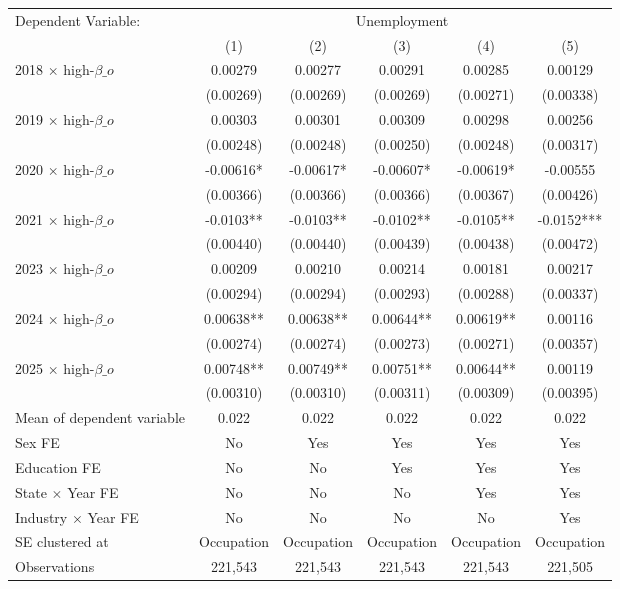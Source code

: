 \def\sym#1{\ifmmode^{#1}\else\(^{#1}\)\fi}
\begin{tabular}{l*{5}{c}}
\toprule
Dependent Variable: & \multicolumn{5}{c}{Unemployment} \\
\cmidrule(lr){2-6}
 & (1) & (2) & (3) & (4) & (5) \\
\midrule
2018 $\times$ high-$\beta\_o$&     0.00279   &     0.00277   &     0.00291   &     0.00285   &     0.00129   \\
            &   (0.00269)   &   (0.00269)   &   (0.00269)   &   (0.00271)   &   (0.00338)   \\
2019 $\times$ high-$\beta\_o$&     0.00303   &     0.00301   &     0.00309   &     0.00298   &     0.00256   \\
            &   (0.00248)   &   (0.00248)   &   (0.00250)   &   (0.00248)   &   (0.00317)   \\
2020 $\times$ high-$\beta\_o$&    -0.00616*  &    -0.00617*  &    -0.00607*  &    -0.00619*  &    -0.00555   \\
            &   (0.00366)   &   (0.00366)   &   (0.00366)   &   (0.00367)   &   (0.00426)   \\
2021 $\times$ high-$\beta\_o$&     -0.0103** &     -0.0103** &     -0.0102** &     -0.0105** &     -0.0152***\\
            &   (0.00440)   &   (0.00440)   &   (0.00439)   &   (0.00438)   &   (0.00472)   \\
2023 $\times$ high-$\beta\_o$&     0.00209   &     0.00210   &     0.00214   &     0.00181   &     0.00217   \\
            &   (0.00294)   &   (0.00294)   &   (0.00293)   &   (0.00288)   &   (0.00337)   \\
2024 $\times$ high-$\beta\_o$&     0.00638** &     0.00638** &     0.00644** &     0.00619** &     0.00116   \\
            &   (0.00274)   &   (0.00274)   &   (0.00273)   &   (0.00271)   &   (0.00357)   \\
2025 $\times$ high-$\beta\_o$&     0.00748** &     0.00749** &     0.00751** &     0.00644** &     0.00119   \\
            &   (0.00310)   &   (0.00310)   &   (0.00311)   &   (0.00309)   &   (0.00395)   \\
\midrule
Mean of dependent variable&       0.022   &       0.022   &       0.022   &       0.022   &       0.022   \\
Sex FE      &          No   &         Yes   &         Yes   &         Yes   &         Yes   \\
Education FE&          No   &          No   &         Yes   &         Yes   &         Yes   \\
State $\times$ Year FE&          No   &          No   &          No   &         Yes   &         Yes   \\
Industry $\times$ Year FE&          No   &          No   &          No   &          No   &         Yes   \\
SE clustered at&  Occupation   &  Occupation   &  Occupation   &  Occupation   &  Occupation   \\
Observations&     221,543   &     221,543   &     221,543   &     221,543   &     221,505   \\
\bottomrule
\end{tabular}
